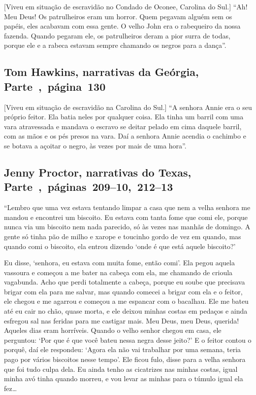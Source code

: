 {[}Viveu em situação de escravidão no Condado de Oconee, Carolina do Sul.{]} ``Ah! Meu Deus! Os patrulheiros eram um horror. Quem pegavam alguém sem
os papéis, eles acabavam com essa gente. O velho John era o rabequeiro
da nossa fazenda. Quando pegaram ele, os patrulheiros deram a pior surra
de todas, porque ele e a rabeca estavam sempre chamando os negros para a
dança''.

\subsection{Tom Hawkins, narrativas da Geórgia, Parte~,~página~130}
\label{ref125}

{[}Viveu em situação de escravidão na Carolina do Sul.{]} ``A senhora Annie era o seu próprio feitor. Ela batia neles por qualquer
coisa. Ela tinha um barril com uma vara atravessada e mandava o escravo
se deitar pelado em cima daquele barril, com as mãos e os pés presos na
vara. Daí a senhora Annie acendia o cachimbo e se botava a açoitar o
negro, às vezes por mais de uma hora''.

\subsection{Jenny Proctor, narrativas do Texas, Parte~,~páginas~209--10,~212--13}
\label{ref217}

``Lembro que uma vez estava tentando limpar a casa que nem a velha
senhora me mandou e encontrei um biscoito. Eu estava com tanta fome que
comi ele, porque nunca via um biscoito nem nada parecido, só às vezes
nas manhãs de domingo. A gente só tinha pão de milho e xarope e toucinho
gordo de vez em quando, mas quando comi o biscoito, ela entrou dizendo
`onde é que está aquele biscoito?'

Eu disse, `senhora, eu estava com muita fome, então comi'. Ela pegou
aquela vassoura e começou a me bater na cabeça com ela, me chamando de
crioula vagabunda. Acho que perdi totalmente a cabeça, porque eu soube
que precisava brigar com ela para me salvar, mas quando comecei a brigar
com ela e o feitor, ele chegou e me agarrou e começou a me espancar com
o bacalhau. Ele me bateu até eu cair no chão, quase morta, e ele deixou
minhas costas em pedaços e ainda esfregou sal nas feridas para me
castigar mais. Meu Deus, meu Deus, querida! Aqueles dias eram horríveis.
Quando o velho senhor chegou em casa, ele perguntou: `Por que é que você
bateu nessa negra desse jeito?' E o feitor contou o porquê, daí ele
respondeu: `Agora ela não vai trabalhar por uma semana, teria pago por
vários biscoitos nesse tempo'. Ele ficou fulo, disse para a velha
senhora que foi tudo culpa dela. Eu ainda tenho as cicatrizes nas minhas
costas, igual minha avó tinha quando morreu, e vou levar as minhas para
o túmulo igual ela fez\ldots{}

